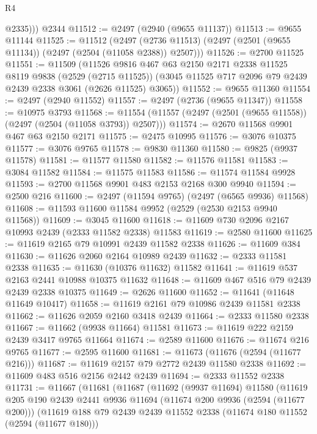\begin{lexlean}{R4}
\begin{coremodule}
          @2335)))
    @2344
@11512 := @2497 (@2940 (@9655 @11137))
@11513 := @9655 @11144
@11525 := @11512
    (@2497 (@2736 @11513) (@2497 (@2501 (@9655 @11134)) (@2497 (@2504 (@11058 @2388)) @2507)))
@11526 := @2700 @11525
@11551 := @11509
    (@11526
      @9816
      @467
      @63
      @2150
      @2171
      @2338
      @11525
      @8119
      @9838
      (@2529 (@2715 @11525))
      (@3045 @11525 @717 @2096 @79 @2439 @2439 @2338 @3061 (@2626 @11525) @3065))
@11552 := @9655 @11360
@11554 := @2497 (@2940 @11552)
@11557 := @2497 (@2736 (@9655 @11347))
@11558 := @10975 @3793
@11568 := @11554 (@11557 (@2497 (@2501 (@9655 @11558)) (@2497 (@2504 (@11058 @3793)) @2507)))
@11574 := @2670 @11568 @9901 @467 @63 @2150 @2171
@11575 := @2475 @10995
@11576 := @3076 @10375
@11577 := @3076 @9765
@11578 := @9830 @11360
@11580 := @9825 (@9937 @11578)
@11581 := @11577 @11580
@11582 := @11576 @11581
@11583 := @3084 @11582
@11584 := @11575 @11583
@11586 := @11574 @11584 @9928
@11593 := @2700 @11568 @9901 @483 @2153 @2168 @300 @9940
@11594 := @2500 @216
@11600 := @2497 (@11594 @9765) (@2497 (@6565 @9936) @11568)
@11608 := @11593 @11600 @11584 @9952 (@2529 (@2530 @2153 @9940 @11568))
@11609 := @3045 @11600
@11618 := @11609 @730 @2096 @2167 @10993 @2439 (@2333 @11582 @2338) @11583
@11619 := @2580 @11600
@11625 := @11619 @2165 @79 @10991 @2439 @11582 @2338
@11626 := @11609 @384
@11630 := @11626 @2060 @2164 @10989 @2439
@11632 := @2333 @11581 @2338
@11635 := @11630 (@10376 @11632) @11582
@11641 := @11619 @537 @2163 @2441 @10988 @10375 @11632
@11648 := @11609 @467 @516 @79 @2439 @2439 @2338 @10375
@11649 := @2626 @11600
@11652 := @11641 (@11648 @11649 @10417)
@11658 := @11619 @2161 @79 @10986 @2439 @11581 @2338
@11662 := @11626 @2059 @2160 @3418 @2439
@11664 := @2333 @11580 @2338
@11667 := @11662 (@9938 @11664) @11581
@11673 := @11619 @222 @2159 @2439 @3417 @9765 @11664
@11674 := @2589 @11600
@11676 := @11674 @216 @9765
@11677 := @2595 @11600
@11681 := @11673 (@11676 (@2594 (@11677 @216)))
@11687 := @11619 @2157 @79 @2772 @2439 @11580 @2338
@11692 := @11609 @483 @516 @2156 @2442 @2439
@11694 := @2333 @11552 @2338
@11731 := @11667
    (@11681
      (@11687
        (@11692
          (@9937 @11694)
          @11580
          (@11619
            @205
            @190
            @2439
            @2441
            @9936
            @11694
            (@11674 @200 @9936 (@2594 (@11677 @200)))
            (@11619
              @188
              @79
              @2439
              @2439
              @11552
              @2338
              (@11674 @180 @11552 (@2594 (@11677 @180)))

\end{coremodule}
\end{lexlean}
